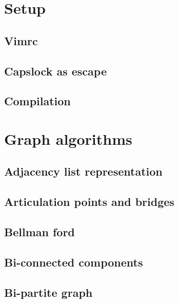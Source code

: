 \section{Setup}
\subsection{Vimrc}
\raggedbottom
\hrulefill
\subsection{Capslock as escape}
\raggedbottom
\hrulefill
\subsection{Compilation}
\raggedbottom
\hrulefill


\section{Graph algorithms}
\subsection{Adjacency list representation}
\raggedbottom
\hrulefill
\subsection{Articulation points and bridges}
\raggedbottom
\hrulefill
\subsection{Bellman ford}
\raggedbottom
\hrulefill
\subsection{Bi-connected components}
\raggedbottom
\hrulefill
\subsection{Bi-partite graph}
\raggedbottom
\hrulefill
